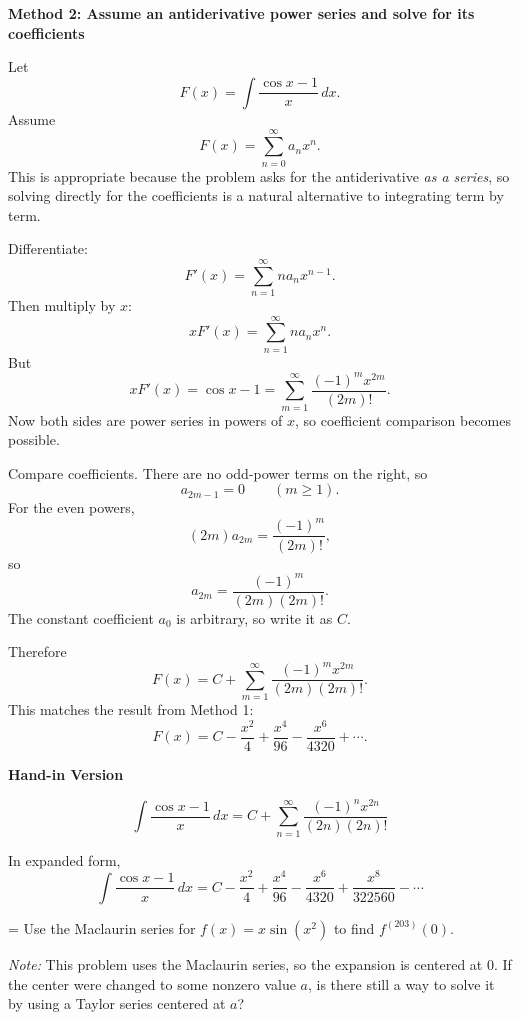 \documentclass[a4paper,12pt,twocolumn]{article}
\newlength{\problemnumberwidth}
\newenvironment{solutionbox}{\begin{framed}}{\end{framed}}
\newcommand{\problem}[3]{%
  \Needspace{10\baselineskip}%
  \phantomsection\label{#1}%
  \par\vspace{0.8em}%
  \noindent
  \hangindent=\problemnumberwidth
  \hangafter=1
  \makebox[\problemnumberwidth][l]{\textbf{#2.}}#3\par
}
\begin{document}
\begin{solutionbox}
\textbf{Method 2: Assume an antiderivative power series and solve for its coefficients}

\begin{steps}
\item Let
\[
F(x)=\int \frac{\cos x-1}{x}\,dx.
\]
Assume
\[
F(x)=\sum_{n=0}^{\infty}a_n x^n.
\]
This is appropriate because the problem asks for the antiderivative \emph{as a series}, so solving directly for the coefficients is a natural alternative to integrating term by term.

\item Differentiate:
\[
F'(x)=\sum_{n=1}^{\infty} n a_n x^{n-1}.
\]
Then multiply by \(x\):
\[
xF'(x)=\sum_{n=1}^{\infty} n a_n x^n.
\]
But
\[
xF'(x)=\cos x-1
=\sum_{m=1}^{\infty}\frac{(-1)^m x^{2m}}{(2m)!}.
\]
Now both sides are power series in powers of \(x\), so coefficient comparison becomes possible.

\item Compare coefficients. There are no odd-power terms on the right, so
\[
a_{2m-1}=0 \qquad (m\ge 1).
\]
For the even powers,
\[
(2m)a_{2m}=\frac{(-1)^m}{(2m)!},
\]
so
\[
a_{2m}=\frac{(-1)^m}{(2m)(2m)!}.
\]
The constant coefficient \(a_0\) is arbitrary, so write it as \(C\).

\item Therefore
\[
F(x)=C+\sum_{m=1}^{\infty}\frac{(-1)^m x^{2m}}{(2m)(2m)!}.
\]
This matches the result from Method 1:
\[
F(x)=C-\frac{x^2}{4}+\frac{x^4}{96}-\frac{x^6}{4320}+\cdots.
\]
\end{steps}
\end{solutionbox}

\begin{solutionbox}
\textbf{Hand-in Version}

\[
\boxed{
\int \frac{\cos x-1}{x}\,dx
=C+\sum_{n=1}^{\infty}\frac{(-1)^n x^{2n}}{(2n)(2n)!}
}
\]

In expanded form,
\[
\boxed{
\int \frac{\cos x-1}{x}\,dx
=C-\frac{x^2}{4}+\frac{x^4}{96}-\frac{x^6}{4320}+\frac{x^8}{322560}-\cdots
}
\]
\end{solutionbox}

\problem{prob:11-10-93}{93}{Use the Maclaurin series for \(f(x)=x\sin(x^2)\) to find \(f^{(203)}(0)\).

\medskip
\noindent\textit{Note:} This problem uses the Maclaurin series, so the expansion is centered at \(0\). If the center were changed to some nonzero value \(a\), is there still a way to solve it by using a Taylor series centered at \(a\)?}
\end{document}
